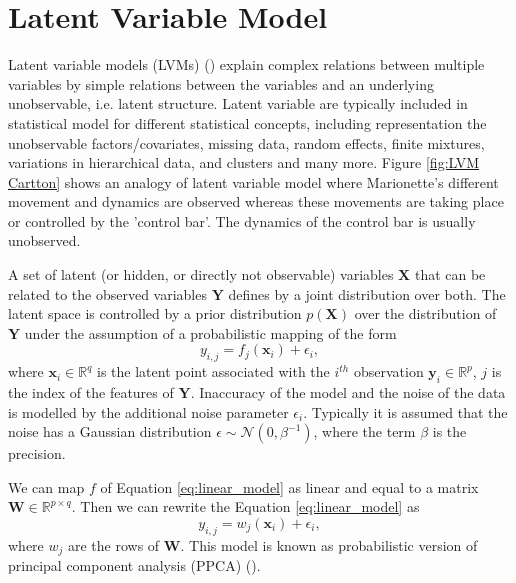 \section{Latent Variable Model}
Latent variable models (LVMs) (\cite{Bishop:1999}) explain complex relations between multiple variables by simple relations between the variables and an underlying unobservable, i.e. latent structure. Latent variable are typically included in statistical model for different statistical concepts, including representation the unobservable factors/covariates, missing data, random effects, finite mixtures, variations in hierarchical data, and clusters and many more. Figure \ref{fig:LVM Cartton} shows an analogy of latent variable model where Marionette's different movement and dynamics are observed whereas these movements are taking place or controlled by the 'control bar'. The dynamics of the control bar is usually unobserved.

A set of latent (or hidden, or directly not observable) variables $\textbf{X}$ that can be related to the observed variables $\textbf{Y}$ defines by a joint distribution over both. The latent space is 
controlled by a prior distribution $p\left(\textbf{X}\right)$ over the distribution of $\textbf{Y}$ under the assumption of a probabilistic mapping of the form
\begin{equation} \label{eq:linear_model}
y_{i,j} = f_j\left(\textbf{x}_{i}\right) + \epsilon_{i},
\end{equation}
where $\textbf{x}_i \in \mathbb{R}^q$ is the latent point associated with the $i^{th}$ observation $\textbf{y}_i \in \mathbb{R}^p$, $j$ is the index of the features of $\textbf{Y}$. Inaccuracy of
the model  and the noise of the data is modelled by the additional noise parameter $\epsilon_{i}$. Typically it is assumed that the noise has a Gaussian distribution $\epsilon \sim \mathcal{N} \left(0,\beta^{-1}\right)$, where the term $\beta$ is the precision.

We can map $f$ of Equation \ref{eq:linear_model} as linear and equal to a matrix $\textbf{W}\in\mathbb{R}^{p\times q}$. Then we can rewrite the Equation \ref{eq:linear_model} as
\begin{equation} \label{eq:linear_model_matrix}
y_{i,j} = w_j\left(\textbf{x}_{i}\right) + \epsilon_{i},
\end{equation}
where $w_j$ are the rows of $\textbf{W}$. This model is known as probabilistic version of principal component analysis (PPCA) (\cite{Roweis:1998, Tipping:1999}). 

